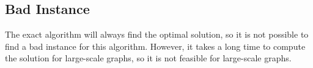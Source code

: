 \subsection{Bad Instance}

The exact algorithm will always find the optimal solution, so it is not possible to
find a bad instance for this algorithm. However, it takes a long time to compute the
solution for large-scale graphs, so it is not feasible for large-scale graphs.